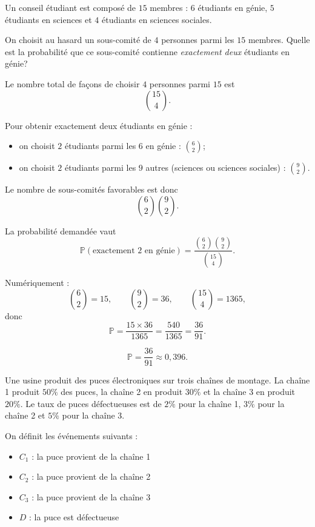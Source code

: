 \begin{questions}
\pageblanche


\question[10]

Un conseil étudiant est composé de \(15\) membres : \(6\) étudiants en génie, \(5\) étudiants en sciences et \(4\) étudiants en sciences sociales.

On choisit au hasard un sous-comité de \(4\) personnes parmi les \(15\) membres. Quelle est la probabilité que ce sous-comité contienne \emph{exactement deux} étudiants en génie?

\begin{solution}
Le nombre total de façons de choisir \(4\) personnes parmi \(15\) est
\[
\binom{15}{4}.
\]

Pour obtenir exactement deux étudiants en génie :
\begin{itemize}
\item on choisit \(2\) étudiants parmi les \(6\) en génie : \(\binom{6}{2}\);
\item on choisit \(2\) étudiants parmi les \(9\) autres (sciences ou sciences sociales) : \(\binom{9}{2}\).
\end{itemize}

Le nombre de sous-comités favorables est donc
\[
\binom{6}{2}\binom{9}{2}.
\]

La probabilité demandée vaut
\[
\mathbb{P}(\text{exactement 2 en génie}) = \frac{\binom{6}{2}\binom{9}{2}}{\binom{15}{4}}.
\]

Numériquement :
\[
\binom{6}{2}=15,\qquad \binom{9}{2}=36,\qquad \binom{15}{4}=1365,
\]
donc
\[
\mathbb{P} = \frac{15\times 36}{1365} = \frac{540}{1365} = \frac{36}{91}.
\]

\[
\boxed{\mathbb{P} = \frac{36}{91} \approx 0{,}396.}
\]
\end{solution}

\pageblanche


\question[]

Une usine produit des puces électroniques sur trois chaînes de montage. La chaîne 1 produit \(50\%\) des puces, la chaîne 2 en produit \(30\%\) et la chaîne 3 en produit \(20\%\). Le taux de puces défectueuses est de \(2\%\) pour la chaîne 1, \(3\%\) pour la chaîne 2 et \(5\%\) pour la chaîne 3.

On définit les événements suivants :
\begin{itemize}
\item \(C_1\) : la puce provient de la chaîne 1
\item \(C_2\) : la puce provient de la chaîne 2
\item \(C_3\) : la puce provient de la chaîne 3
\item \(D\) : la puce est défectueuse
\end{itemize}


\end{questions}
